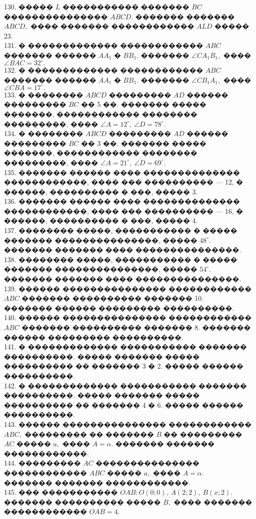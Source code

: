 \documentclass[12pt]{article}
\begin{document}
130. ����� $L$ ����������� ������� $BC$ ��������������� $ABCD.$ ������� ������� $ABCD,$ ���� ������� ������������ $ALD$ ����� 23.\\
131. � ������������� ������������ $ABC$ ������� ������ $AA_1$ � $BB_1.$ ������� $\angle CA_1B_1,$ ���� $\angle BAC=32^\circ.$\\
132. � ������������� ������������ $ABC$ ������� ������ $AA_1$ � $BB_1.$ ������� $\angle CB_1A_1,$ ���� $\angle CBA=17^\circ.$\\
133. � �������� $ABCD$ ��������� $AD$ ������ ��������� $BC$ �� 5 ��. ������� ����� �������, ������������ �������� ���������, ���� $\angle A=12^\circ,\ \angle D=78^\circ.$\\
134. � �������� $ABCD$ ��������� $AD$ ������ ��������� $BC$ �� 3 ��. ������� ����� �������, ������������ �������� ���������, ���� $\angle A=21^\circ,\ \angle D=69^\circ.$\\
135. ������� ������ ���� �������������� ������������, ���� ��� ���������� --- 12, � ������, ���������� � ���, ����� 3.\\
136. ������� ������ ���� �������������� ������������, ���� ��� ���������� --- 16, � ������, ���������� � ���, ����� 4.\\
137. �������� �����, ����������� � ����� ������� ���������������, ����� $48^\circ.$ ������� ������� ���� ���������������.\\
138. �������� �����, ����������� � ����� ������� ���������������, ����� $54^\circ.$ ������� ������� ���� ���������������.\\
139. ������ ��������������� ������������ $ABC$ ������� ���������� ������� 10. ������� ������ ��������� ����������.\\
140. ������ ��������������� ������������ $ABC$ ������� ���������� ������� 8. ������� ������ ��������� ����������.\\
141. � ������������� ����������� ������� ����������. ����� ������� ����� ���������� �� ������� 3 � 2. ����� ������ ����������.\\
142. � ������������� ����������� ������� ����������. ����� ������� ����� ���������� �� ������� 4 � 6. ����� ������ ����������.\\
143. ������ ��������������� ������������ $ABC,$ ��������� �� ������� $B$ �� ��������� $AC$ ����� $a,$ ���� $A=\alpha.$ ������� ������� ������������.\\
144. ��������� $AC$ ��������������� ������������ $ABC$ ����� $a,$ ���� $A=\alpha.$ ������� ������� ������������.\\
145. ��� ����������� $OAB: O(0;0),\ A(2;2),\ B(x;2).$ ������� ���������� ����� $B,$ ���� ������� ������������ $OAB=4.$\\
\end{document}
